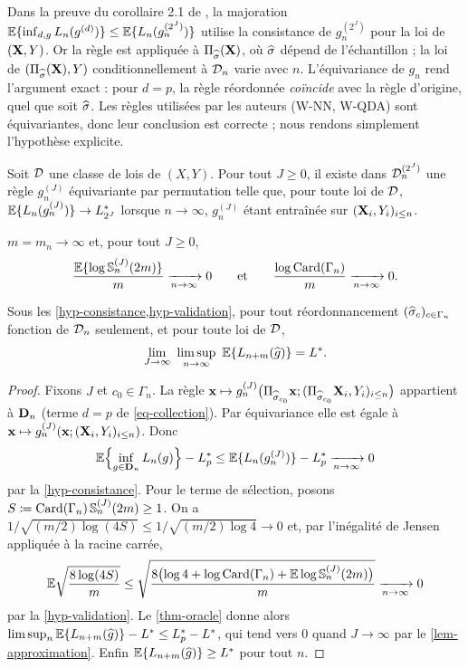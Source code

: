 \begin{remarque}\label{rem-equivariance}
Dans la preuve du corollaire 2.1 de \citet{berlinet2008functional}, la majoration $\mathbb{E}\{\inf_{d,g}L_n(g^{(d)})\}\le\mathbb{E}\{L_n(g_n^{(2^J)})\}$ utilise la consistance de $g^{(2^J)}_n$ pour la loi de $(\mathbf{X},Y)$. Or la règle est appliquée à $\Pi_{\widehat{\sigma}}(\mathbf{X})$, où $\widehat{\sigma}$ dépend de l'échantillon ; la loi de $(\Pi_{\widehat{\sigma}}(\mathbf{X}),Y)$ conditionnellement à $\mathcal{D}_n$ varie avec $n$. L'équivariance de $g_n$ rend l'argument exact : pour $d=p$, la règle réordonnée \emph{coïncide} avec la règle d'origine, quel que soit $\widehat{\sigma}$. Les règles utilisées par les auteurs (W-NN, W-QDA) sont équivariantes, donc leur conclusion est correcte ; nous rendons simplement l'hypothèse explicite.
\end{remarque}

\begin{hypothese}\label{hyp-consistance}
Soit $\mathcal{D}$ une classe de lois de $(X,Y)$. Pour tout $J\ge0$, il existe dans $\mathcal{D}_n^{(2^J)}$ une règle $g_n^{(J)}$ équivariante par permutation telle que, pour toute loi de $\mathcal{D}$, $\mathbb{E}\{L_n(g_n^{(J)})\}\to L^*_{2^J}$ lorsque $n\to\infty$, $g_n^{(J)}$ étant entraînée sur $(\mathbf{X}_i,Y_i)_{i\le n}$.
\end{hypothese}

\begin{hypothese}\label{hyp-validation}
$m=m_n\to\infty$ et, pour tout $J\ge0$,
\[
  \frac{\mathbb{E}\{\log\mathbb{S}^{(J)}_n(2m)\}}{m}\xrightarrow[n\to\infty]{}0
  \qquad\text{et}\qquad
  \frac{\log\operatorname{Card}(\Gamma_n)}{m}\xrightarrow[n\to\infty]{}0 .
\]
\end{hypothese}

\begin{corollaire}\label{cor-consistance}
Sous les \cref{hyp-consistance,hyp-validation}, pour tout réordonnancement $(\widehat{\sigma}_c)_{c\in\Gamma_n}$ fonction de $\mathcal{D}_n$ seulement, et pour toute loi de $\mathcal{D}$,
\[
  \lim_{J\to\infty}\ \limsup_{n\to\infty}\ \E\{L_{n+m}(\hg)\}=L^* .
\]
\end{corollaire}

\begin{proof}
Fixons $J$ et $c_0\in\Gamma_n$. La règle $\mathbf{x}\mapsto g_n^{(J)}\bigl(\Pi_{\widehat{\sigma}_{c_0}}\mathbf{x};(\Pi_{\widehat{\sigma}_{c_0}}\mathbf{X}_i,Y_i)_{i\le n}\bigr)$ appartient à $\mathbf{D}_n$ (terme $d=p$ de \eqref{eq-collection}). Par équivariance elle est égale à $\mathbf{x}\mapsto g_n^{(J)}(\mathbf{x};(\mathbf{X}_i,Y_i)_{i\le n})$. Donc
\[
  \mathbb{E}\Bigl\{\inf_{g\in\mathbf{D}_n}L_n(g)\Bigr\}-L^*_p\le\mathbb{E}\{L_n(g_n^{(J)})\}-L^*_p\xrightarrow[n\to\infty]{}0
\]
par la \cref{hyp-consistance}. Pour le terme de sélection, posons $S\coloneqq\operatorname{Card}(\Gamma_n)\,\mathbb{S}^{(J)}_n(2m)\ge1$. On a $1/\sqrt{(m/2)\log(4S)}\le1/\sqrt{(m/2)\log4}\to0$ et, par l'inégalité de Jensen appliquée à la racine carrée,
\[
  \mathbb{E}\sqrt{\frac{8\log(4S)}{m}}\le\sqrt{\frac{8\bigl(\log4+\log\operatorname{Card}(\Gamma_n)+\mathbb{E}\log\mathbb{S}^{(J)}_n(2m)\bigr)}{m}}\xrightarrow[n\to\infty]{}0
\]
par la \cref{hyp-validation}. Le \cref{thm-oracle} donne alors $\limsup_n\mathbb{E}\{L_{n+m}(\widehat{g})\}-L^*\le L^*_p-L^*$, qui tend vers $0$ quand $J\to\infty$ par le \cref{lem-approximation}. Enfin $\mathbb{E}\{L_{n+m}(\widehat{g})\}\ge L^*$ pour tout $n$.
\end{proof}

